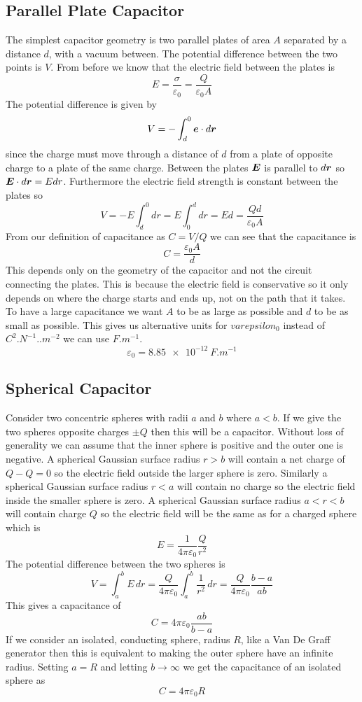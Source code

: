 \documentclass{article}
\begin{document}
    \subsection{Parallel Plate Capacitor}
    The simplest capacitor geometry is two parallel plates of area \(A\) separated by a distance \(d\), with a vacuum between.
    The potential difference between the two points is \(V\).
    From before we know that the electric field between the plates is
    \[E = \frac{\sigma}{\varepsilon_0} = \frac{Q}{\varepsilon_0 A}\]
    The potential difference is given by
    \[V = -\int_d^0 \bm{e}\cdot d\bm{r}\]
    since the charge must move through a distance of \(d\) from a plate of opposite charge to a plate of the same charge.
    Between the plates \(\bm{E}\) is parallel to \(d\bm{r}\) so \(\bm{E}\cdot d\bm{r} = Edr\).
    Furthermore the electric field strength is constant between the plates so
    \[V = -E\int_d^0 dr = E\int_0^d dr = Ed = \frac{Qd}{\varepsilon_0 A}\]
    From our definition of capacitance as \(C = V/Q\) we can see that the capacitance is
    \[C = \frac{\varepsilon_0 A}{d}\]
    This depends only on the geometry of the capacitor and not the circuit connecting the plates.
    This is because the electric field is conservative so it only depends on where the charge starts and ends up, not on the path that it takes.
    To have a large capacitance we want \(A\) to be as large as possible and \(d\) to be as small as possible.
    This gives us alternative units for \(varepsilon_0\) instead of \(\si{C^2.N^{-1}..m^{-2}}\) we can use \(\si{F.m^{-1}}\).
    \[\varepsilon_0 = \SI{8.85e-12}{F.m^{-1}}\]
    
    \subsection{Spherical Capacitor}
    Consider two concentric spheres with radii \(a\) and \(b\) where \(a < b\).
    If we give the two spheres opposite charges \(\pm Q\) then this will be a capacitor.
    Without loss of generality we can assume that the inner sphere is positive and the outer one is negative.
    A spherical Gaussian surface radius \(r > b\) will contain a net charge of \(Q - Q = 0\) so the electric field outside the larger sphere is zero.
    Similarly a spherical Gaussian surface radius \(r < a\) will contain no charge so the electric field inside the smaller sphere is zero.
    A spherical Gaussian surface radius \(a < r < b\) will contain charge \(Q\) so the electric field will be the same as for a charged sphere which is
    \[E = \frac{1}{4\pi\varepsilon_0}\frac{Q}{r^2}\]
    The potential difference between the two spheres is
    \[V = \int_a^b E\,dr = \frac{Q}{4\pi\varepsilon_0}\int_a^b\frac{1}{r^2}\,dr = \frac{Q}{4\pi\varepsilon_0}\frac{b - a}{ab}\]
    This gives a capacitance of
    \[C = 4\pi\varepsilon_0\frac{ab}{b - a}\]
    If we consider an isolated, conducting sphere, radius \(R\), like a Van De Graff generator then this is equivalent to making the outer sphere have an infinite radius.
    Setting \(a = R\) and letting \(b\to\infty\) we get the capacitance of an isolated sphere as
    \[C = 4\pi\varepsilon_0R\]
    
\end{document}

